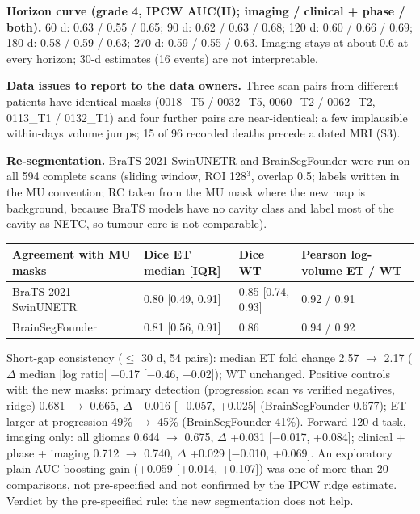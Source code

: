 \documentclass[11pt,a4paper]{article}
\begin{document}
\textbf{Horizon curve (grade 4, IPCW AUC(H); imaging / clinical + phase / both).} 60 d: 0.63 / 0.55 / 0.65; 90
d: 0.62 / 0.63 / 0.68; 120 d: 0.60 / 0.66 / 0.69; 180 d: 0.58 / 0.59 / 0.63; 270 d: 0.59 / 0.55 / 0.63.
Imaging stays at about 0.6 at every horizon; 30-d estimates (16 events) are not interpretable.

\textbf{Data issues to report to the data owners.} Three scan pairs from different patients have identical
masks (0018\_T5 / 0032\_T5, 0060\_T2 / 0062\_T2, 0113\_T1 / 0132\_T1) and four further pairs are
near-identical; a few implausible within-days volume jumps; 15 of 96 recorded deaths precede a dated MRI (S3).

\textbf{Re-segmentation.} BraTS 2021 SwinUNETR and BrainSegFounder were run on all 594 complete scans (sliding
window, ROI 128$^{3}$, overlap 0.5; labels written in the MU convention; RC taken from the MU mask where the
new map is background, because BraTS models have no cavity class and label most of the cavity as NETC, so
tumour core is not comparable).

\begin{table}[H]
\centering
\small
\begin{tabularx}{\linewidth}{@{}L R{3.07cm} R{3.07cm} R{2.20cm}@{}}
\toprule
Agreement with MU masks & Dice ET median [IQR] & Dice WT & Pearson log-volume ET / WT \\
\midrule
BraTS 2021 SwinUNETR & 0.80 [0.49, 0.91] & 0.85 [0.74, 0.93] & 0.92 / 0.91 \\
BrainSegFounder & 0.81 [0.56, 0.91] & 0.86 & 0.94 / 0.92 \\
\bottomrule
\end{tabularx}
\end{table}

Short-gap consistency ($\leq$ 30 d, 54 pairs): median ET fold change 2.57 $\rightarrow$ 2.17 ($\Delta$ median
|log ratio| $-$0.17 [$-$0.46, $-$0.02]); WT unchanged. Positive controls with the new masks: primary detection
(progression scan vs verified negatives, ridge) 0.681 $\rightarrow$ 0.665, $\Delta$ $-$0.016 [$-$0.057,
+0.025] (BrainSegFounder 0.677); ET larger at progression 49\% $\rightarrow$ 45\% (BrainSegFounder 41\%).
Forward 120-d task, imaging only: all gliomas 0.644 $\rightarrow$ 0.675, $\Delta$ +0.031 [$-$0.017, +0.084];
clinical + phase + imaging 0.712 $\rightarrow$ 0.740, $\Delta$ +0.029 [$-$0.010, +0.069]. An exploratory
plain-AUC boosting gain (+0.059 [+0.014, +0.107]) was one of more than 20 comparisons, not pre-specified and
not confirmed by the IPCW ridge estimate. Verdict by the pre-specified rule: the new segmentation does not
help.
\end{document}

